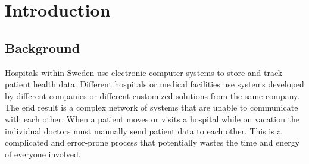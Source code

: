 \documentclass[14pt]{article}
\begin{document}
\begin{abstract}

\glspl{EHR} are rapidly expanding in their use and their benefits are well known. Significant reduction in the cost of care, improved quality of care, and improved record keeping are just a few of the benefits of using an \gls{EHR}. It is for these reasons that many medical institutions are rapidly adopting \glspl{EHR}. 

An explosion of innovation has stemmed from this rapid adoption and has produced many different solutions from many different providers. Unfortunately, these solutions tend to store and transmit the information that they collect in formats that are not compatible with each other. In order to maximize the benefit received from these \glspl{EHR} they must be able to share information between different systems and locations.

This paper reports on the various aspects of achieving \gls{EHR} \gls{interoperability}.
\end{abstract}

\newpage

\tableofcontents

\newpage

%
%
%

\section{Introduction}
\label{sec:Introduction}

\subsection{Background}
Hospitals within Sweden use electronic computer systems to store and track patient health data. Different hospitals or medical facilities use systems developed by different companies or different customized solutions from the same company. The end result is a complex network of systems that are unable to communicate with each other. When a patient moves or visits a hospital while on vacation the individual doctors must manually send patient data to each other. This is a complicated and error-prone process that potentially wastes the time and energy of everyone involved.
\end{document}
